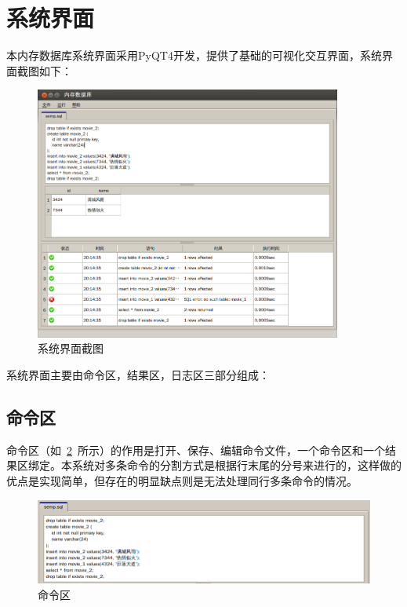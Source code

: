 \documentclass{zjutthesis}
\begin{document}
\section{系统界面}
本内存数据库系统界面采用PyQT4开发，提供了基础的可视化交互界面，系统界面截图如下：
\begin{figure}[H]
\centering
\includegraphics[width=0.9\textwidth]{GUI}
\caption{系统界面截图}\label{fig:GUI}
\vspace{\baselineskip} %
\end{figure}
系统界面主要由命令区，结果区，日志区三部分组成：

\subsection{命令区}
命令区（如~\ref{fig:CommandPart}~所示）的作用是打开、保存、编辑命令文件，一个命令区和一个结果区绑定。本系统对多条命令的分割方式是根据行末尾的分号来进行的，这样做的优点是实现简单，但存在的明显缺点则是无法处理同行多条命令的情况。
\begin{figure}[H]
\centering
\includegraphics[width=\textwidth]{CommandPart}
\caption{命令区}\label{fig:CommandPart}
\vspace{\baselineskip} %
\end{figure}
\end{document}
